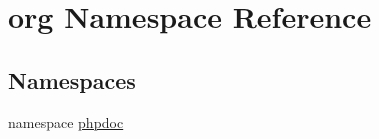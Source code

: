 \hypertarget{namespaceorg}{\section{org \-Namespace \-Reference}
\label{namespaceorg}
}
\subsection*{\-Namespaces}
\begin{DoxyCompactItemize}
\item 
namespace \hyperlink{namespaceorg_1_1phpdoc}{phpdoc}
\end{DoxyCompactItemize}
